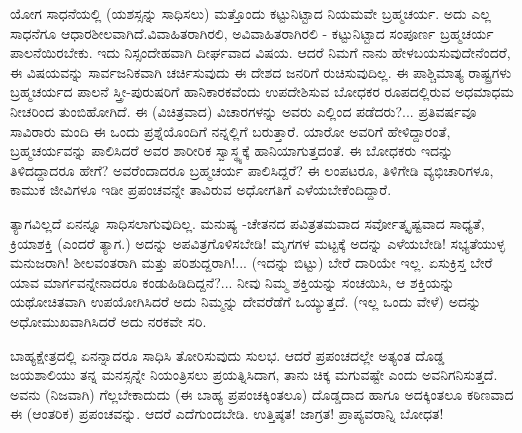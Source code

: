 \newpage

ಯೋಗ ಸಾಧನೆಯಲ್ಲಿ (ಯಶಸ್ಸನ್ನು ಸಾಧಿಸಲು) ಮತ್ತೊಂದು ಕಟ್ಟುನಿಟ್ಟಾದ ನಿಯಮವೇ ಬ್ರಹ್ಮಚರ್ಯ. ಅದು ಎಲ್ಲ ಸಾಧನೆಗೂ ಆಧಾರಶೀಲವಾಗಿದೆ.\break ವಿವಾಹಿತರಾಗಿರಲಿ, ಅವಿವಾಹಿತರಾಗಿರಲಿ - ಕಟ್ಟುನಿಟ್ಟಾದ ಸಂಪೂರ್ಣ ಬ್ರಹ್ಮಚರ್ಯ ಪಾಲನೆಯಿರಬೇಕು. ಇದು ನಿಸ್ಸಂದೇಹವಾಗಿ ದೀರ್ಘವಾದ ವಿಷಯ. ಆದರೆ ನಿಮಗೆ ನಾನು ಹೇಳಬಯಸುವುದೇನೆಂದರೆ, ಈ ವಿಷಯವನ್ನು ಸಾರ್ವಜನಿಕವಾಗಿ ಚರ್ಚಿಸುವುದು ಈ ದೇಶದ ಜನರಿಗೆ ರುಚಿಸುವುದಿಲ್ಲ. ಈ ಪಾಶ್ಚಿಮಾತ್ಯ ರಾಷ್ಟ್ರಗಳು ಬ್ರಹ್ಮಚರ್ಯದ ಪಾಲನೆ ಸ್ತ್ರೀ-ಪುರುಷರಿಗೆ ಹಾನಿಕಾರಕವೆಂದು ಉಪದೇಶಿಸುವ ಬೋಧಕರ ರೂಪದಲ್ಲಿರುವ ಅಧಮಾಧಮ ನೀಚರಿಂದ ತುಂಬಿಹೋಗಿದೆ. ಈ (ವಿಚಿತ್ರವಾದ) ವಿಚಾರಗಳನ್ನು ಅವರು ಎಲ್ಲಿಂದ ಪಡೆದರು?... ಪ್ರತಿವರ್ಷವೂ ಸಾವಿರಾರು ಮಂದಿ ಈ ಒಂದು ಪ್ರಶ್ನೆಯೊಂದಿಗೆ ನನ್ನಲ್ಲಿಗೆ ಬರುತ್ತಾರೆ. ಯಾರೋ ಅವರಿಗೆ ಹೇಳಿದ್ದಾರಂತೆ, ಬ್ರಹ್ಮಚರ್ಯವನ್ನು ಪಾಲಿಸಿದರೆ ಅವರ ಶಾರೀರಿಕ ಸ್ವಾಸ್ಥ್ಯಕ್ಕೆ ಹಾನಿಯಾಗುತ್ತದಂತೆ. ಈ ಬೋಧಕರು ಇದನ್ನು ತಿಳಿದದ್ದಾದರೂ ಹೇಗೆ? ಅವರೆಂದಾದರೂ ಬ್ರಹ್ಮಚರ್ಯ ಪಾಲಿಸಿದ್ದರೆ? ಈ ಲಂಪಟರೂ, ತಿಳಿಗೇಡಿ ವ್ಯಭಿಚಾರಿಗಳೂ, ಕಾಮುಕ ಜೀವಿಗಳೂ ಇಡೀ ಪ್ರಪಂಚವನ್ನೇ ತಾವಿರುವ ಅಧೋಗತಿಗೆ ಎಳೆಯಬೇಕೆಂದಿದ್ದಾರೆ.

ತ್ಯಾಗವಿಲ್ಲದೆ ಏನನ್ನೂ ಸಾಧಿಸಲಾಗುವುದಿಲ್ಲ. ಮನುಷ್ಯ -ಚೇತನದ ಪವಿತ್ರತಮವಾದ ಸರ್ವೋತ್ಕೃಷ್ಟವಾದ ಸಾಧ್ಯತೆ, ಕ್ರಿಯಾಶಕ್ತಿ (ಎಂದರೆ ತ್ಯಾಗ.) ಅದನ್ನು ಅಪವಿತ್ರಗೊಳಿಸಬೇಡಿ! ಮೃಗಗಳ ಮಟ್ಟಕ್ಕೆ ಅದನ್ನು ಎಳೆಯಬೇಡಿ! ಸಭ್ಯತೆಯುಳ್ಳ ಮನುಜರಾಗಿ! ಶೀಲವಂತರಾಗಿ ಮತ್ತು ಪರಿಶುದ್ದರಾಗಿ!... (ಇದನ್ನು ಬಿಟ್ಟು) ಬೇರೆ ದಾರಿಯೇ ಇಲ್ಲ. ಏಸುಕ್ರಿಸ್ತ ಬೇರೆ ಯಾವ ಮಾರ್ಗವನ್ನೇನಾದರೂ ಕಂಡುಹಿಡಿದಿದ್ದನೆ?... ನೀವು ನಿಮ್ಮ ಶಕ್ತಿಯನ್ನು ಸಂಚಯಿಸಿ, ಆ ಶಕ್ತಿಯನ್ನು ಯಥೋಚಿತವಾಗಿ ಉಪಯೋಗಿಸಿದರೆ ಅದು ನಿಮ್ಮನ್ನು ದೇವರೆಡೆಗೆ ಒಯ್ಯುತ್ತದೆ. (ಇಲ್ಲ ಒಂದು ವೇಳೆ) ಅದನ್ನು ಅಧೋಮುಖವಾಗಿಸಿದರೆ ಅದು ನರಕವೇ ಸರಿ.

ಬಾಹ್ಯಕ್ಷೇತ್ರದಲ್ಲಿ ಏನನ್ನಾದರೂ ಸಾಧಿಸಿ ತೋರಿಸುವುದು ಸುಲಭ. ಆದರೆ ಪ್ರಪಂಚದಲ್ಲೇ ಅತ್ಯಂತ ದೊಡ್ಡ ಜಯಶಾಲಿಯು ತನ್ನ ಮನಸ್ಸನ್ನೇ ನಿಯಂತ್ರಿಸಲು ಪ್ರಯತ್ನಿಸಿದಾಗ, ತಾನು ಚಿಕ್ಕ ಮಗುವಷ್ಟೇ ಎಂದು ಅವನಿಗನಿಸುತ್ತದೆ. ಅವನು (ನಿಜವಾಗಿ) ಗೆಲ್ಲಬೇಕಾದುದು (ಈ ಬಾಹ್ಯ ಪ್ರಪಂಚಕ್ಕಿಂತಲೂ) ದೊಡ್ಡದಾದ ಹಾಗೂ ಅದಕ್ಕಿಂತಲೂ ಕಠಿಣವಾದ ಈ (ಆಂತರಿಕ) ಪ್ರಪಂಚವನ್ನು. ಆದರೆ ಎದೆಗುಂದಬೇಡಿ. ಉತ್ತಿಷ್ಠತ! ಜಾಗ್ರತ! ಪ್ರಾಪ್ಯವರಾನ್ನಿ ಬೋಧತ!

